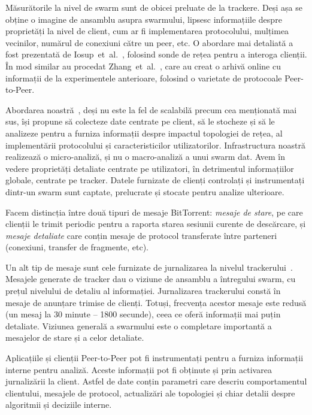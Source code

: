 Măsurătorile la nivel de swarm sunt de obicei preluate de la trackere. Deși
așa se obține o imagine de ansamblu asupra swarmului, lipsesc informațiile
despre proprietăți la nivel de client, cum ar fi implementarea protocolului,
mulțimea vecinilor, numărul de conexiuni către un peer, etc. O abordare
mai detaliată a fost prezentată de 
Iosup~et~al.~\cite{corr-overlay}, folosind sonde de rețea pentru a interoga
clienții. În mod similar au procedat
Zhang~et~al.~\cite{p2p-trace-archive}, care au creat o arhivă online cu
informații de la experimentele anterioare, folosind o varietate de protocoale
Peer-to-Peer.

Abordarea noastră~\cite{enhanced-logging}, deși nu este la fel de scalabilă
precum cea menționată mai sus, își propune să colecteze date centrate
pe client, să le stocheze și să le analizeze pentru a furniza informații
despre impactul topologiei de rețea, al implementării protocolului și
caracteristicilor utilizatorilor. Infrastructura noastră realizează o
micro-analiză, și nu o macro-analiză a unui swarm dat. Avem în vedere
proprietăți detaliate centrate pe utilizatori, în detrimentul informațiilor
globale, centrate pe tracker. Datele furnizate de clienți controlați și
instrumentați dintr-un swarm sunt captate, prelucrate și stocate pentru
analize ulterioare.

Facem distincția între două tipuri de mesaje BitTorrent:
\textit{mesaje de stare}, pe care clienții le trimit periodic pentru a
raporta starea sesiunii curente de descărcare, și \textit{mesaje detaliate}
care conțin mesaje de protocol transferate între parteneri (conexiuni,
transfer de fragmente, etc).

Un alt tip de mesaje sunt cele furnizate de jurnalizarea la nivelul trackerului~\cite{tracker-mon}. Mesajele generate de tracker dau o viziune de ansamblu a
întregului swarm, cu prețul nivelului de detaliu al informației. Jurnalizarea
trackerului constă în mesaje de anunțare trimise de clienți. Totuși,
frecvența acestor mesaje este redusă (un mesaj la 30 minute -- 1800 secunde),
ceea ce oferă informații mai puțin detaliate. Viziunea generală a swarmului
este o completare importantă a mesajelor de stare și a celor detaliate.

Aplicațiile și clienții Peer-to-Peer pot fi instrumentați pentru a furniza
informații interne pentru analiză. Aceste informații pot fi obținute și prin
activarea jurnalizării la client. Astfel de date conțin parametri care descriu
comportamentul clientului, mesajele de protocol, actualizări ale topologiei
și chiar detalii despre algoritmii și deciziile interne.

